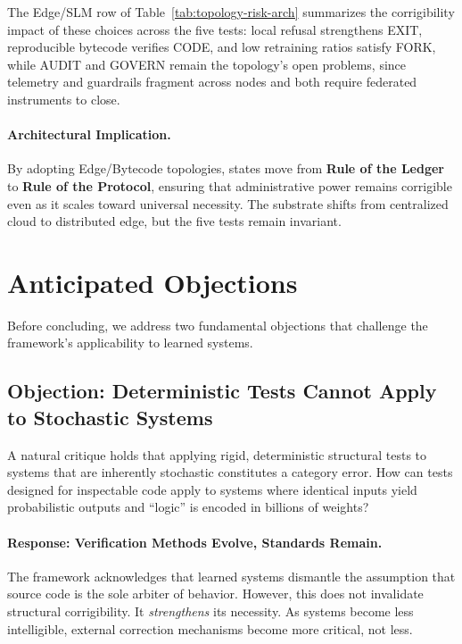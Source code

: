\documentclass{article}
\theoremstyle{definition}
\begin{document}
The Edge/SLM row of Table~\ref{tab:topology-risk-arch} summarizes the corrigibility impact of these choices across the five tests: local refusal strengthens EXIT, reproducible bytecode verifies CODE, and low retraining ratios satisfy FORK, while AUDIT and GOVERN remain the topology's open problems, since telemetry and guardrails fragment across nodes and both require federated instruments to close.

\paragraph{Architectural Implication.} By adopting Edge/Bytecode topologies, states move from \textbf{Rule of the Ledger} to \textbf{Rule of the Protocol}, ensuring that administrative power remains corrigible even as it scales toward universal necessity. The substrate shifts from centralized cloud to distributed edge, but the five tests remain invariant.


\section{Anticipated Objections}
\label{sec:objections}

Before concluding, we address two fundamental objections that challenge the framework's applicability to learned systems.

\subsection{Objection: Deterministic Tests Cannot Apply to Stochastic Systems}

A natural critique holds that applying rigid, deterministic structural tests to systems that are inherently stochastic constitutes a category error. How can tests designed for inspectable code apply to systems where identical inputs yield probabilistic outputs and ``logic'' is encoded in billions of weights?

\paragraph{Response: Verification Methods Evolve, Standards Remain.} The framework acknowledges that learned systems dismantle the assumption that source code is the sole arbiter of behavior. However, this does not invalidate structural corrigibility. It \textit{strengthens} its necessity. As systems become less intelligible, external correction mechanisms become more critical, not less.
\end{document}
